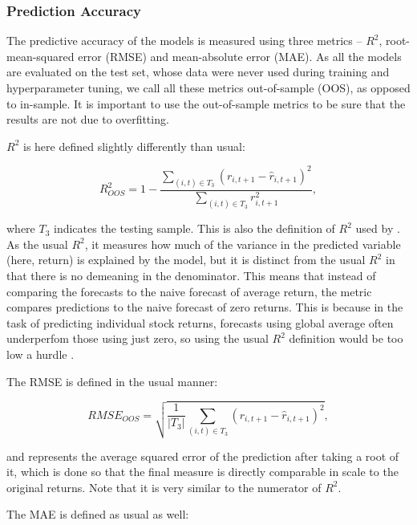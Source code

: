 		\subsubsection{Prediction Accuracy} 
		
			The predictive accuracy of the models is measured using three metrics – $R^2$, root-mean-squared error (RMSE) and mean-absolute error (MAE). As all the models are evaluated on the test set, whose data were never used during training and hyperparameter tuning, we call all these metrics out-of-sample (OOS), as opposed to in-sample. It is important to use the out-of-sample metrics to be sure that the results are not due to overfitting. 
			
			$R^2$ is here defined slightly differently than usual:
			
			\begin{equation*}
				R^2_{OOS} = 1 - \frac{ \sum_{(i,t)\in T_3} \left(r_{i,t+1}-	\hat{r}_{i, t+1}\right) ^2}{\sum_{(i,t)\in T_3} r_{i,t+1}^2}, 		
			\end{equation*}
			
			where $T_3$ indicates the testing sample. This is also the definition of $R^2$ used by \cite{gu2020empirical}. As the usual $R^2$, it measures how much of the variance in the predicted variable (here, return) is explained by the model, but it is distinct from the usual $R^2$ in that there is no demeaning in the denominator. This means that instead of comparing the forecasts to the naive forecast of average return, the metric compares predictions to the naive forecast of zero returns. This is because in the task of predicting individual stock returns, forecasts using global average often underperfom those using just zero, so using the usual $R^2$ definition would be too low a hurdle \citep{gu2020empirical}. 
			
			The RMSE is defined in the usual manner:   
			
			\begin{equation*}
				RMSE_{OOS} = \sqrt{ \frac{1}{|T_3|} \sum_{(i,t)\in T_3} \left(r_{i,t+1}-	\hat{r}_{i, t+1}\right) ^2},	
			\end{equation*}
			
			and represents the average squared error of the prediction after taking a root of it, which is done so that the final measure is directly comparable in scale to the original returns. Note that it is very similar to the numerator of $R^2$.
			
			The MAE is defined as usual as well: 
			
